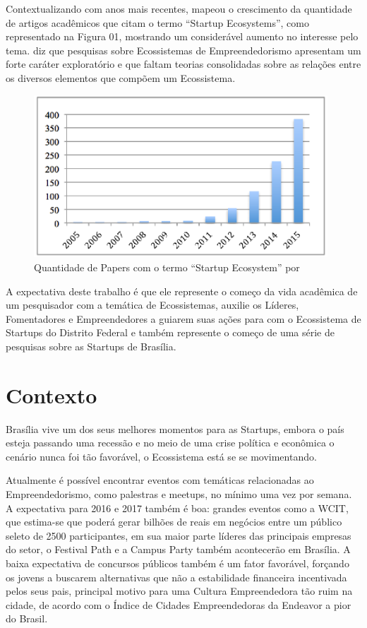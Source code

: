Contextualizando com anos mais recentes,  mapeou o crescimento da quantidade de artigos acadêmicos que citam o termo ``Startup Ecosystems'', como representado na Figura 01, mostrando um considerável aumento no interesse pelo tema.  diz que pesquisas sobre Ecossistemas de Empreendedorismo apresentam um forte caráter exploratório e que faltam teorias consolidadas sobre as relações entre os diversos elementos que compõem um Ecossistema. 

\begin{figure}[!htb]
\centering
\includegraphics[width=11cm,angle=0]{figuras/papers_about_startup_ecosystems}
\caption{Quantidade de Papers com o termo ``Startup Ecosystem'' por }
\label{figure:papers_about_startup_ecosystems}
\end{figure}

A expectativa deste trabalho é que ele represente o começo da vida acadêmica de um pesquisador com a temática de Ecossistemas, auxilie os Líderes, Fomentadores e Empreendedores a guiarem suas ações para com o Ecossistema de Startups do Distrito Federal e também represente o começo de uma série de pesquisas sobre as Startups de Brasília. 

\section{Contexto}
\label{section:contexto}

Brasília vive um dos seus melhores momentos para as Startups, embora o país esteja passando uma recessão e no meio de uma crise política e econômica o cenário nunca foi tão favorável, o Ecossistema está se se movimentando. 

Atualmente é possível encontrar eventos com temáticas relacionadas ao Empreendedorismo, como palestras e meetups, no mínimo uma vez por semana. A expectativa para 2016 e 2017 também é boa: grandes eventos como a WCIT, que estima-se que poderá gerar bilhões de reais em negócios entre um público seleto de 2500 participantes, em sua maior parte líderes das principais empresas do setor, o Festival Path e a Campus Party também acontecerão em Brasília. A baixa expectativa de concursos públicos também é um fator favorável, forçando os jovens a buscarem alternativas que não a estabilidade financeira incentivada pelos seus pais, principal motivo para uma Cultura Empreendedora tão ruim na cidade, de acordo com o Índice de Cidades Empreendedoras da Endeavor a pior do Brasil.


